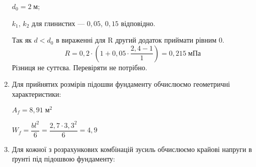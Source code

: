 \documentclass[a4paper,14pt]{article}
\begin{document}
\begin{enumerate}
    $d_0 = 2\;\textit{м}$;

    $k_1$, $k_2$ для глинистих --- $0,05$, $0,15$ відповідно.

    Так як $d < d_0$ в вираженні для R другий додаток приймати рівним 0.
    $$R = 0,2 \cdot \left(1 + 0,05 \cdot \dfrac{2,4-1}{1}\right) = 0,215\;\textit{мПа}$$
    Різниця не суттєва. Перевіряти не потрібно.
    \item Для прийнятих розмірів підошви фундаменту обчислюємо геометричні характеристики:
    
    $A_f = 8,91\;\textit{м}^2$

    $W_f = \dfrac{bl^2}{6} = \dfrac{2,7 \cdot 3,3^2}{6} = 4,9$
    \item Для кожної з розрахункових комбінацій зусиль обчислюємо крайові напруги в ґрунті під підошвою фундаменту:
    

\end{enumerate}
\end{document}
